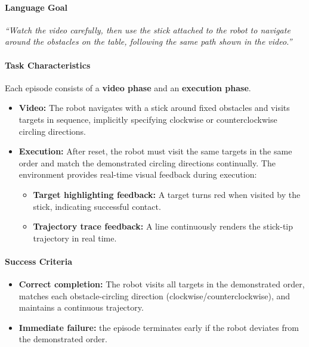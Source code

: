\paragraph{Language Goal} \textit{``Watch the video carefully, then use the stick attached to the robot to navigate around the obstacles on the table, following the same path shown in the video.''}

\paragraph{Task Characteristics}

Each episode consists of a \textbf{video phase} and an \textbf{execution phase}.

\begin{itemize}[itemsep=1pt, topsep=0pt, leftmargin=*]

    \item \textbf{Video:} The robot navigates with a stick around fixed obstacles and visits targets in sequence, implicitly specifying clockwise or counterclockwise circling directions.

    \item \textbf{Execution:} After reset, the robot must visit the same targets in the same order and match the demonstrated circling directions continually. The environment provides real-time visual feedback during execution:
    \begin{itemize}[itemsep=1pt, topsep=0pt, leftmargin=*]
        \item \textbf{Target highlighting feedback:} A target turns red when visited by the stick, indicating successful contact.
        \item \textbf{Trajectory trace feedback:} A line continuously renders the stick-tip trajectory in real time.
    \end{itemize}

\end{itemize}


\paragraph{Success Criteria}

\begin{itemize}[itemsep=1pt, topsep=0pt, leftmargin=*]

    \item \textbf{Correct completion:} The robot visits all targets in the demonstrated order, matches each obstacle-circling direction (clockwise/counterclockwise), and maintains a continuous trajectory.

    \item \textbf{Immediate failure:} the episode terminates early if the robot deviates from the demonstrated order.
\end{itemize}

